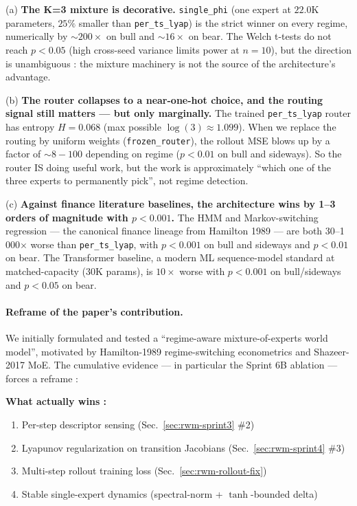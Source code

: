 \documentclass[11pt,a4paper]{article}
\begin{document}
(a) \textbf{The K=3 mixture is decorative.}
\texttt{single\_phi} (one expert at $22.0$K parameters,
$25\%$ smaller than \texttt{per\_ts\_lyap}) is the strict
winner on every regime, numerically by $\sim 200\times$ on bull
and $\sim 16\times$ on bear. The Welch t-tests do not reach
$p{<}0.05$ (high cross-seed variance limits power at $n{=}10$),
but the direction is unambiguous : the mixture machinery is not
the source of the architecture's advantage.

(b) \textbf{The router collapses to a near-one-hot choice, and
the routing signal still matters --- but only marginally.}
The trained \texttt{per\_ts\_lyap} router has entropy
$H{=}0.068$ (max possible $\log(3) {\approx} 1.099$). When we
replace the routing by uniform weights (\texttt{frozen\_router}),
the rollout MSE blows up by a factor of $\sim 8{-}100$ depending
on regime ($p{<}0.01$ on bull and sideways). So the router IS
doing useful work, but the work is approximately ``which one of
the three experts to permanently pick'', not regime detection.

(c) \textbf{Against finance literature baselines, the architecture
wins by 1--3 orders of magnitude with $p{<}0.001$.} The HMM and
Markov-switching regression --- the canonical finance lineage from
Hamilton 1989 --- are both 30--1\,000$\times$ worse than
\texttt{per\_ts\_lyap}, with $p{<}0.001$ on bull and sideways and
$p{<}0.01$ on bear. The Transformer baseline, a modern ML
sequence-model standard at matched-capacity ($30$K params), is
$10\times$ worse with $p{<}0.001$ on bull/sideways and
$p{<}0.05$ on bear.

\paragraph{Reframe of the paper's contribution.}
We initially formulated and tested a ``regime-aware mixture-of-experts
world model'', motivated by Hamilton-1989 regime-switching
econometrics and Shazeer-2017 MoE. The cumulative evidence ---
in particular the Sprint 6B ablation --- forces a reframe :

\textbf{What actually wins :}
\begin{enumerate}[leftmargin=*]
\item Per-step descriptor sensing (Sec.~\ref{sec:rwm-sprint3} \#2)
\item Lyapunov regularization on transition Jacobians (Sec.~\ref{sec:rwm-sprint4} \#3)
\item Multi-step rollout training loss (Sec.~\ref{sec:rwm-rollout-fix})
\item Stable single-expert dynamics (spectral-norm + $\tanh$-bounded delta)
\end{enumerate}
\end{document}

